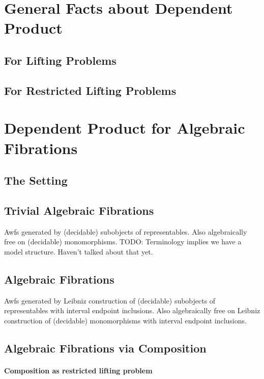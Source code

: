 \documentclass[reqno,10pt,a4paper,oneside]{amsart}
\begin{document}
\section{General Facts about Dependent Product}

\subsection{For Lifting Problems}

\subsection{For Restricted Lifting Problems}

\section{Dependent Product for Algebraic Fibrations}

\subsection{The Setting}

\subsection{Trivial Algebraic Fibrations}

Awfs generated by (decidable) subobjects of representables.
Also algebraically free on (decidable) monomorphisms.
TODO: Terminology implies we have a model structure.
Haven't talked about that yet.

\subsection{Algebraic Fibrations}

Awfs generated by Leibniz construction of (decidable) subobjects of representables with interval endpoint inclusions.
Also algebraically free on Leibniz construction of (decidable) monomorphisms with interval endpoint inclusions.

\subsection{Algebraic Fibrations via Composition}

\paragraph{Composition as restricted lifting problem}
\end{document}
